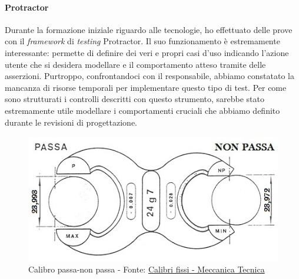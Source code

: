 \paragraph{Protractor}
Durante la formazione iniziale riguardo alle tecnologie, ho effettuato delle prove con il \textit{framework} di \textit{testing} Protractor. Il suo funzionamento è estremamente interessante: permette di definire dei veri e propri casi d'uso indicando l'azione utente che si desidera modellare e il comportamento atteso tramite delle asserzioni.
Purtroppo, confrontandoci con il responsabile, abbiamo constatato la mancanza di risorse temporali per implementare questo tipo di test. Per come sono strutturati i controlli descritti con questo strumento, sarebbe stato estremamente utile modellare i comportamenti cruciali che abbiamo definito durante le revisioni di progettazione.
\begin{figure}[H]
    \centering
    \includegraphics[width=0.65\columnwidth]{immagini/passa-non-passa.jpg}
    \caption{Calibro passa-non passa - Fonte: \href{https://meccanicatecnica.altervista.org/calibri-fissi/}{Calibri fissi - Meccanica Tecnica}}
    \label{fig:passaNonPassa}
\end{figure}
